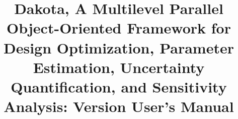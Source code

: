 \documentclass[ps2pdf,11pt,report,strict]{SANDreport}
\title{Dakota, A Multilevel Parallel Object-Oriented Framework for 
Design Optimization, Parameter Estimation, Uncertainty Quantification, 
and Sensitivity Analysis: Version \DakotaVersion\space User's Manual}
\author{\DakotaAuthorLong}
\begin{document}
\maketitle
\begin{abstract}
\DakotaAbstractShared
\DakotaAbstractUsers
\end{abstract}


\SANDmain 






\begin{SANDdistribution}[NM]





\end{SANDdistribution}

\end{document}

